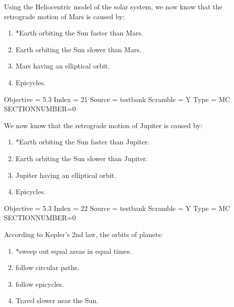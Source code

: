 \documentclass[11pt]{article}
\begin{document}
\begin{enumerate}
\begin{minipage}{\textwidth}
\begin{minipage}{\textwidth}
\item Using the Heliocentric model of the solar system, we now know that the retrograde motion of Mars is caused by:
\begin{enumerate} 
\setlength{\itemsep}{1pt} 
\setlength{\parskip}{0pt} 
\setlength{\parsep}{0pt}
\setlength{\multicolsep}{1pt} 
\item *Earth orbiting the Sun faster than Mars.
\item Earth orbiting the Sun slower than Mars.
\item Mars having an elliptical orbit.
\item Epicycles.
\end{enumerate} 
Objective = 5.3
Index = 21
Source = testbank
Scramble = Y
Type = MC
SECTIONNUMBER=0
\end{minipage}
\end{minipage}
\vskip 0.20in

\begin{minipage}{\textwidth}
\begin{minipage}{\textwidth}
\item We now know that the retrograde motion of Jupiter is caused by:
\begin{enumerate} 
\setlength{\itemsep}{1pt} 
\setlength{\parskip}{0pt} 
\setlength{\parsep}{0pt}
\setlength{\multicolsep}{1pt} 
\item *Earth orbiting the Sun faster than Jupiter.
\item Earth orbiting the Sun slower than Jupiter.
\item Jupiter having an elliptical orbit.
\item Epicycles.
\end{enumerate} 
Objective = 5.3
Index = 22
Source = testbank
Scramble = Y
Type = MC
SECTIONNUMBER=0
\end{minipage}
\end{minipage}
\vskip 0.20in

\begin{minipage}{\textwidth}
\begin{minipage}{\textwidth}
\item According to Kepler's 2nd law, the orbits of planets:
\begin{multicols}{2}
\begin{enumerate} 
\setlength{\itemsep}{1pt} 
\setlength{\parskip}{0pt} 
\setlength{\parsep}{0pt}
\setlength{\multicolsep}{1pt} 
\item *sweep out equal areas in equal times.
\item follow circular paths.
\item follow epicycles.
\item Travel slower near the Sun.
\end{enumerate} 
\vfill 
\end{multicols}


\end{minipage}
\end{minipage}
\end{enumerate}
\end{document}
